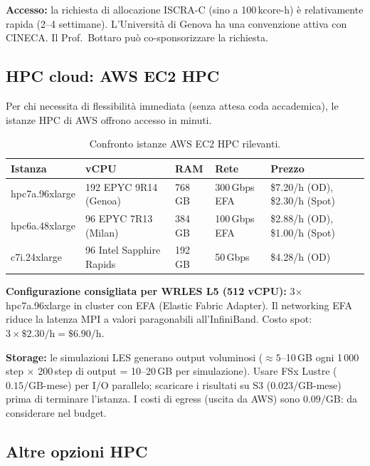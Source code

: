 \documentclass[11pt,a4paper]{article}
\begin{document}
\textbf{Accesso:} la richiesta di allocazione ISCRA-C (sino a 100\,kcore-h) è relativamente rapida (2--4 settimane). L'Università di Genova ha una convenzione attiva con CINECA. Il Prof.\ Bottaro può co-sponsorizzare la richiesta.

\subsection{HPC cloud: AWS EC2 HPC}

Per chi necessita di flessibilità immediata (senza attesa coda accademica), le istanze HPC di AWS offrono accesso in minuti.

\begin{table}[H]
  \centering
  \caption{Confronto istanze AWS EC2 HPC rilevanti.}
  \label{tab:aws}
  \begin{tabularx}{\textwidth}{lXXXX}
    \toprule
    \rowcolor{tablehead}
    \textbf{Istanza} & \textbf{vCPU} & \textbf{RAM} & \textbf{Rete} & \textbf{Prezzo} \\
    \midrule
    hpc7a.96xlarge & 192 EPYC 9R14 (Genoa) & 768\,GB & 300\,Gbps EFA & \$7.20/h (OD), \$2.30/h (Spot) \\
    hpc6a.48xlarge & 96 EPYC 7R13 (Milan) & 384\,GB & 100\,Gbps EFA & \$2.88/h (OD), \$1.00/h (Spot) \\
    c7i.24xlarge & 96 Intel Sapphire Rapids & 192\,GB & 50\,Gbps & \$4.28/h (OD) \\
    \bottomrule
  \end{tabularx}
\end{table}

\textbf{Configurazione consigliata per WRLES L5 (512 vCPU):} 3$\times$ hpc7a.96xlarge in cluster con EFA (Elastic Fabric Adapter). Il networking EFA riduce la latenza MPI a valori paragonabili all'InfiniBand. Costo spot: $3\times\$2.30/\text{h} = \$6.90/\text{h}$.

\textbf{Storage:} le simulazioni LES generano output voluminosi ($\approx 5$--10\,GB ogni 1\,000 step × 200\,step di output = 10--20\,GB per simulazione). Usare FSx Lustre ($0.15/\text{GB-mese}$) per I/O parallelo; scaricare i risultati su S3 ($0.023/\text{GB-mese}$) prima di terminare l'istanza. I costi di egress (uscita da AWS) sono $0.09/\text{GB}$: da considerare nel budget.

\subsection{Altre opzioni HPC}
\end{document}

